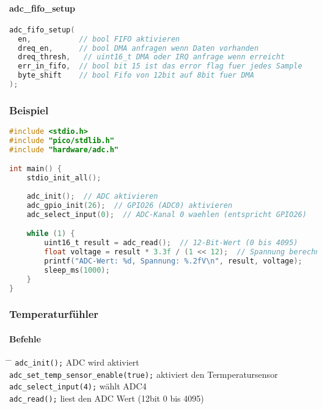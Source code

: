 \documentclass[a4paper,12pt,twoside]{article}
\begin{document}
\paragraph{adc\_fifo\_setup}
\begin{center}
	\begin{minipage}{1.0\textwidth}
		\begin{lstlisting}[language=C]
adc_fifo_setup(
  en,           // bool FIFO aktivieren 
  dreq_en,      // bool DMA anfragen wenn Daten vorhanden
  dreq_thresh,   // uint16_t DMA oder IRQ anfrage wenn erreicht
  err_in_fifo,  // bool bit 15 ist das error flag fuer jedes Sample
  byte_shift    // bool Fifo von 12bit auf 8bit fuer DMA
);
	  \end{lstlisting}
	\end{minipage}
\end{center}
\subsubsection{Beispiel}
\begin{center}
	\begin{minipage}{1.0\textwidth}
		\begin{lstlisting}[language=C]
#include <stdio.h>
#include "pico/stdlib.h"
#include "hardware/adc.h"

int main() {
    stdio_init_all();
    
    adc_init();  // ADC aktivieren
    adc_gpio_init(26);  // GPIO26 (ADC0) aktivieren
    adc_select_input(0);  // ADC-Kanal 0 waehlen (entspricht GPIO26)

    while (1) {
        uint16_t result = adc_read();  // 12-Bit-Wert (0 bis 4095)
        float voltage = result * 3.3f / (1 << 12);  // Spannung berechnen
        printf("ADC-Wert: %d, Spannung: %.2fV\n", result, voltage);
        sleep_ms(1000);
    }
}
	  \end{lstlisting}
	\end{minipage}
\end{center}
\subsubsection{Temperaturfühler}
\paragraph{Befehle}
\begin{tabbing}
	\hspace{5mm} \= \hspace{80mm} \= \kill
	\> \verb|adc_init();| \> ADC wird aktiviert \\
	\> \verb|adc_set_temp_sensor_enable(true);| \> aktiviert den Termperatursensor \\
	\> \verb|adc_select_input(4);| \> wählt ADC4 \\
	\> \verb|adc_read();| \> liest den ADC Wert (12bit 0 bis 4095) \\
\end{tabbing}
\end{document}
